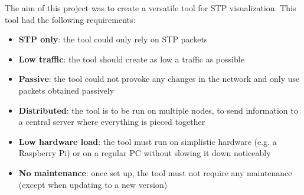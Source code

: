 The aim of this project was to create a versatile tool for STP visualization.
This tool had the following requirements:
\begin{itemize}
    \item \textbf{STP only}: the tool could only rely on STP packets
    \item \textbf{Low traffic}: the tool should create as low a traffic as possible
    \item \textbf{Passive}: the tool could not provoke any changes in the network and only use packets obtained passively
    \item \textbf{Distributed}: the tool is to be run on multiple nodes, to send information to a central server where everything is pieced together
    \item \textbf{Low hardware load}: the tool must run on simplistic hardware (e.g. a Raspberry Pi) or on a regular PC without slowing it down noticeably
    \item \textbf{No maintenance}: once set up, the tool must not require any maintenance (except when updating to a new version)
    \label{requirements}
\end{itemize}

